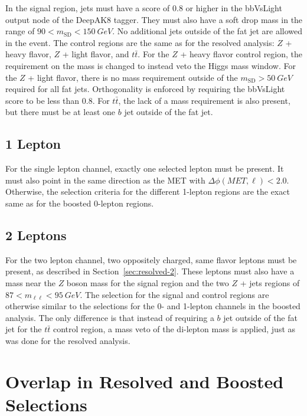 In the signal region, jets must have a score of 0.8 or higher in the
bbVsLight output node of the DeepAK8 tagger.
They must also have a soft drop mass in the range of $90 < m_\mathrm{SD} < \SI{150}{GeV}$.
No additional jets outside of the fat jet are allowed in the event.
The control regions are the same as for the resolved analysis:
$Z$ + heavy flavor, $Z$ + light flavor, and $t\bar{t}$.
For the $Z$ + heavy flavor control region,
the requirement on the mass is changed to instead veto the Higgs mass window.
For the $Z$ + light flavor, there is no mass requirement outside of the
$m_\textrm{SD} > \SI{50}{GeV}$ required for all fat jets.
Orthogonality is enforced by requiring the bbVsLight score to be less than 0.8.
For $t\bar{t}$, the lack of a mass requirement is also present,
but there must be at least one $b$ jet outside of the fat jet.

\subsection{1 Lepton}

For the single lepton channel, exactly one selected lepton must be present.
It must also point in the same direction as the MET with $\Delta \phi(MET, \ell) < 2.0$.
Otherwise, the selection criteria for the different 1-lepton regions
are the exact same as for the boosted 0-lepton regions.

\subsection{2 Leptons}

For the two lepton channel, two oppositely charged, same flavor leptons must be present,
as described in Section~\ref{sec:resolved-2}.
These leptons must also have a mass near the $Z$ boson mass for the signal region
and the two $Z$ + jets regions of $87 < m_{\ell\ell} < \SI{95}{GeV}$.
The selection for the signal and control regions are otherwise similar to the selections
for the 0- and 1-lepton channels in the boosted analysis.
The only difference is that instead of requiring a $b$ jet outside of the fat jet
for the $t\bar{t}$ control region,
a mass veto of the di-lepton mass is applied, just as was done for the resolved analysis.

\section{Overlap in Resolved and Boosted Selections}

